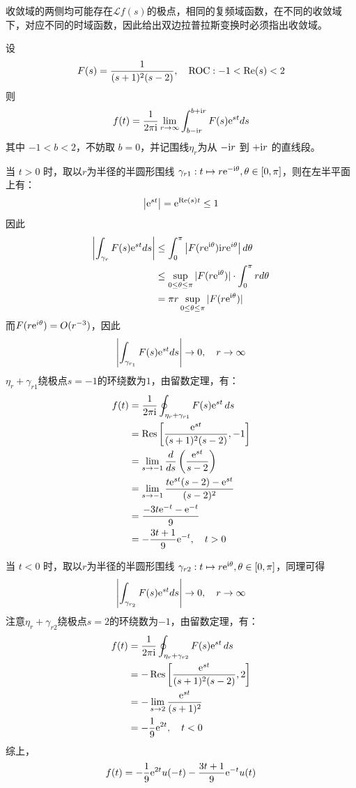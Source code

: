 收敛域的两侧均可能存在$\mathcal{L} f(s)$的极点，相同的复频域函数，在不同的收敛域下，对应不同的时域函数，因此给出双边拉普拉斯变换时必须指出收敛域。

\begin{example}
    设
    \[
    F(s) = \frac{1}{(s+1)^2(s-2)},\quad \operatorname{ROC}:-1<\mathrm{Re}(s)<2
    \]
    则
    \[
    f(t) = \frac{1}{2\pi \mathrm{i}} \lim_{r \to \infty} \int_{b - \mathrm{i} r}^{b + \mathrm{i} r} F(s) \mathrm{e}^{st} ds
    \]
    其中 $-1 < b < 2$，不妨取 $b=0$，并记围线$\eta_r$为从 $- \mathrm{i} r$ 到 $+ \mathrm{i} r$ 的直线段。

    当 $t>0$ 时，取以$r$为半径的半圆形围线 $\gamma_{r1}:t\mapsto r \mathrm{e}^{-\mathrm{i}\theta}, \theta \in [0, \pi]$，则在左半平面上有：
    $$\left|\mathrm{e}^{st}\right| = \mathrm{e}^{\mathrm{Re}(s)t} \le 1$$
    因此
    \begin{align*}
        \left|\int_{\gamma_r} F(s) \mathrm{e}^{st} ds\right| &\leq \int_{0}^{\pi} \left| F(r \mathrm{e}^{\mathrm{i}\theta}) \mathrm{i} r \mathrm{e}^{i\theta} \right|d\theta  \\
        &\leq \sup_{0 \leq \theta \leq \pi} |F(r \mathrm{e}^{\mathrm{i}\theta})|\cdot \int_{0}^{\pi} r d\theta \\
        &= \pi r \sup_{0 \leq \theta \leq \pi} |F(r \mathrm{e}^{\mathrm{i}\theta})|
    \end{align*}
    而$F(r\mathrm{e}^{i\theta})=O(r^{-3})$，因此
    \[
    \left|\int_{\gamma_{r_1}} F(s) \mathrm{e}^{st} ds\right| \to 0, \quad r \to \infty
    \]
    $\eta_r+\gamma_{r1}$绕极点$s=-1$的环绕数为$1$，由留数定理，有：
    \begin{align*}
        f(t)&=\frac{1}{2\pi\mathrm{i}}\oint_{\eta_r+\gamma_{r1}}F(s)\mathrm{e}^{st}\,ds\\
        &=\operatorname{Res}\left[\frac{\mathrm{e}^{st}}{(s+1)^2(s-2)}, -1\right] \\
        &= \lim_{s \to -1} \frac{d}{ds} \left( \frac{\mathrm{e}^{st}}{s-2} \right)\\
        &= \lim_{s \to -1} \frac{t \mathrm{e}^{st}(s-2) - \mathrm{e}^{st}}{(s-2)^2}\\
        &= \frac{-3t \mathrm{e}^{-t} - \mathrm{e}^{-t}}{9}\\
        &= -\frac{3t + 1}{9}\mathrm{e}^{-t},\quad t>0
    \end{align*}

    当 $t<0$ 时，取以$r$为半径的半圆形围线 $\gamma_{r2}:t\mapsto r \mathrm{e}^{\mathrm{i}\theta}, \theta \in [0, \pi]$，同理可得
    $$\left|\int_{\gamma_{r_2}} F(s) \mathrm{e}^{st} ds\right| \to 0, \quad r \to \infty$$
    注意$\eta_r+\gamma_{r2}$绕极点$s=2$的环绕数为$-1$，由留数定理，有：
    \begin{align*}
        f(t)&=\frac{1}{2\pi\mathrm{i}}\oint_{\eta_r+\gamma_{r2}}F(s)\mathrm{e}^{st}\,ds\\
        &=-\operatorname{Res}\left[\frac{\mathrm{e}^{st}}{(s+1)^2(s-2)}, 2\right] \\
        &= -\lim_{s \to 2} \frac{\mathrm{e}^{st}}{(s+1)^2} \\
        &= -\frac{1}{9} \mathrm{e}^{2t},\quad t<0
    \end{align*}
    综上，
    $$f(t)=-\frac{1}{9}\mathrm{e}^{2t}u(-t)-\frac{3t + 1}{9}\mathrm{e}^{-t}u(t)$$
\end{example}

